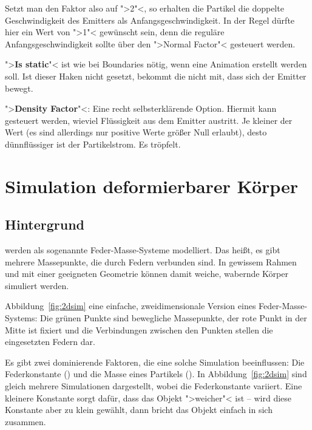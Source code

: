 \documentclass[10pt,DIV=14,a4paper]{scrartcl}
\begin{document}
	Setzt man den Faktor also auf ">2"<, so erhalten die Partikel die
	doppelte Geschwindigkeit des Emitters als Anfangsgeschwindigkeit. In
	der Regel dürfte hier ein Wert von ">1"< gewünscht sein, denn die
	reguläre Anfangsgeschwindigkeit sollte über den ">Normal Factor"<
	gesteuert werden.

	\item ">\textbf{Is static}"< ist wie bei Boundaries nötig, wenn eine
	Animation erstellt werden soll. Ist dieser Haken nicht gesetzt,
	bekommt die \fluidsim nicht mit, dass sich der Emitter bewegt.

	\item ">\textbf{Density Factor}"<: Eine recht selbsterklärende
	Option. Hiermit kann gesteuert werden, wieviel Flüssigkeit aus dem
	Emitter austritt. Je kleiner der Wert (es sind allerdings nur
	positive Werte größer Null erlaubt), desto dünnflüssiger ist der
	Partikelstrom. Es tröpfelt.

\itE




\pagebreak
\section{Simulation deformierbarer Körper}

\subsection{Hintergrund}
 werden als sogenannte Feder-Masse-Systeme
modelliert. Das heißt, es gibt mehrere Massepunkte, die durch Federn
verbunden sind. In gewissem Rahmen und mit einer geeigneten Geometrie
können damit weiche, wabernde Körper simuliert werden.

Abbildung~\ref{fig:2dsim} eine einfache, zweidimensionale Version eines
Feder-Masse-Systems: Die grünen Punkte sind bewegliche Massepunkte, der
rote Punkt in der Mitte ist fixiert und die Verbindungen zwischen den
Punkten stellen die eingesetzten Federn dar.

Es gibt zwei dominierende Faktoren, die eine solche Simulation
beeinflussen: Die Federkonstante () und die Masse
eines Partikels (). In Abbildung~\ref{fig:2dsim}
sind gleich mehrere Simulationen dargestellt, wobei die Federkonstante
variiert. Eine kleinere Konstante sorgt dafür, dass das Objekt
">weicher"< ist -- wird diese Konstante aber zu klein gewählt, dann
bricht das Objekt einfach in sich zusammen.
\end{document}
